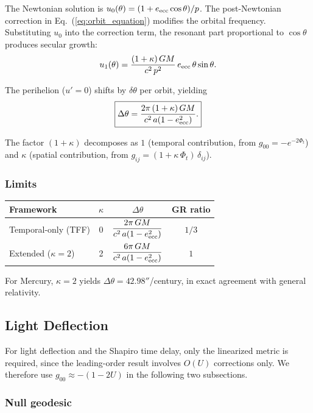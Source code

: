 \documentclass[12pt]{article}
\begin{document}
The Newtonian solution is $u_0(\theta) = (1 + e_{\rm ecc}\cos\theta)/p$. The post-Newtonian correction in Eq.~(\ref{eq:orbit_equation}) modifies the orbital frequency. Substituting $u_0$ into the correction term, the resonant part proportional to $\cos\theta$ produces secular growth:
$$
u_1(\theta) = \frac{(1+\kappa)\,GM}{c^2\,p^2}\,e_{\rm ecc}\,\theta\sin\theta.
$$

The perihelion ($u' = 0$) shifts by $\delta\theta$ per orbit, yielding
\begin{equation}
\boxed{\Delta\theta = \frac{2\pi\,(1 + \kappa)\,GM}{c^2\,a(1 - e_{\rm ecc}^2)}.}
\label{eq:perihelion}
\end{equation}

The factor $(1 + \kappa)$ decomposes as $1$ (temporal contribution, from $g_{00} = -e^{-2\Phi_t}$) and $\kappa$ (spatial contribution, from $g_{ij} = (1 + \kappa\,\Phi_t)\,\delta_{ij}$).

\subsubsection{Limits}

\begin{center}
\small
\begin{tabular}{lccc}
\hline
Framework & $\kappa$ & $\Delta\theta$ & GR ratio \\
\hline
Temporal-only (TFF) & 0 & $\dfrac{2\pi\,GM}{c^2\,a(1-e_{\rm ecc}^2)}$ & $1/3$ \\[8pt]
Extended ($\kappa = 2$) & 2 & $\dfrac{6\pi\,GM}{c^2\,a(1-e_{\rm ecc}^2)}$ & $1$ \\
\hline
\end{tabular}
\end{center}

For Mercury, $\kappa = 2$ yields $\Delta\theta = 42.98''$/century, in exact agreement with general relativity.

\subsection{Light Deflection}
\label{sec:deflection}

For light deflection and the Shapiro time delay, only the linearized metric is required, since the leading-order result involves $O(U)$ corrections only. We therefore use $g_{00} \approx -(1-2U)$ in the following two subsections.

\subsubsection{Null geodesic}
\end{document}
